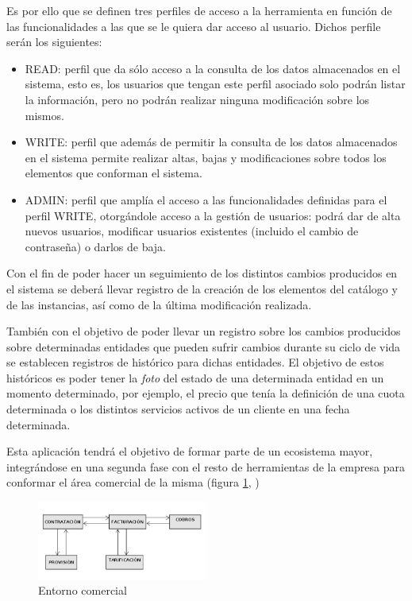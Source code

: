 Es por ello que se definen tres perfiles de acceso a la herramienta en función de las funcionalidades a las que se le quiera dar acceso al usuario. Dichos perfile serán los siguientes:

\begin{itemize}
\item READ: perfil que da sólo acceso a la consulta de los datos almacenados en el sistema, esto es, los usuarios que tengan este perfil asociado solo podrán listar la información, pero no podrán realizar ninguna modificación sobre los mismos.
\item WRITE: perfil que además de permitir la consulta de los datos almacenados en el sistema permite realizar altas, bajas y modificaciones sobre todos los elementos que conforman el sistema.
\item ADMIN: perfil que amplía el acceso a las funcionalidades definidas para el perfil WRITE, otorgándole acceso a la gestión de usuarios: podrá dar de alta nuevos usuarios, modificar usuarios existentes (incluido el cambio de contraseña) o darlos de baja.
\end{itemize}


Con el fin de poder hacer un seguimiento de los distintos cambios producidos en el sistema se deberá llevar registro de la creación de los elementos  del catálogo y de las instancias, así como de la última modificación realizada.

También con el objetivo de poder llevar un registro sobre los cambios producidos sobre determinadas entidades que pueden sufrir cambios durante su ciclo de vida se establecen registros de histórico para dichas entidades. El objetivo de estos históricos es poder tener la \textit{foto} del estado de una determinada entidad en un momento determinado, por ejemplo, el precio que tenía la definición de una cuota determinada o los distintos servicios activos de un cliente en una fecha determinada.


Esta aplicación tendrá el objetivo de formar parte de un ecosistema mayor, integrándose en una segunda fase con el resto de herramientas de la empresa para conformar el área comercial de la misma (figura \ref{fig:area-comercial}, \pageref{fig:area-comercial})

\begin{figure}[hp!]
  \centering
  \includegraphics[width=0.50\textwidth]{imaxes/area-comercial.png}
  \caption{Entorno comercial}
  \label{fig:area-comercial}
\end{figure}


